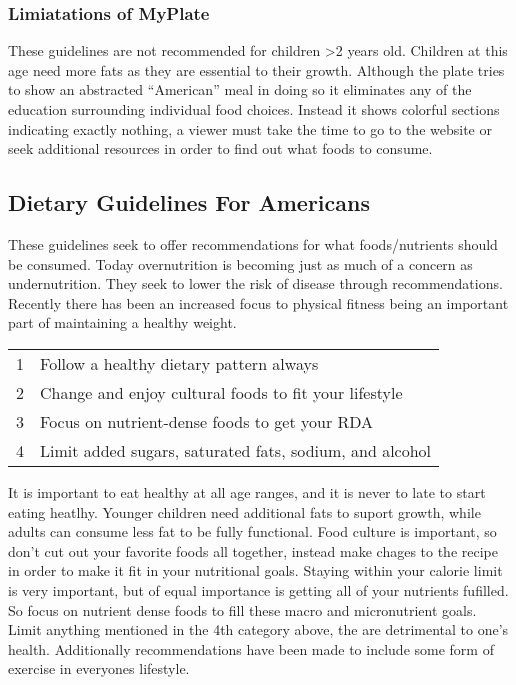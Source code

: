 \documentclass[letterpaper, 11pt]{article}
\begin{document}
\subsubsection{Limiatations of MyPlate}
\label{sec:org5655828}
These guidelines are not recommended for children >2 years old. Children at this age need more fats as they are essential to their growth. Although the plate tries to show an abstracted ``American'' meal in doing so it eliminates any of the education surrounding individual food choices. Instead it shows colorful sections indicating exactly nothing, a viewer must take the time to go to the website or seek additional resources in order to find out what foods to consume.\\
\subsection{Dietary Guidelines For Americans}
\label{sec:org3f27608}
These guidelines seek to offer recommendations for what foods/nutrients should be consumed. Today overnutrition is becoming just as much of a concern as undernutrition. They seek to lower the risk of disease through recommendations. Recently there has been an increased focus to physical fitness being an important part of maintaining a healthy weight.\\
\begin{center}
\begin{tabular}{rl}
1 & Follow a healthy dietary pattern always\\
2 & Change and enjoy cultural foods to fit your lifestyle\\
3 & Focus on nutrient-dense foods to get your RDA\\
4 & Limit added sugars, saturated fats, sodium, and alcohol\\
\end{tabular}
\end{center}
It is important to eat healthy at all age ranges, and it is never to late to start eating heatlhy. Younger children need additional fats to suport growth, while adults can consume less fat to be fully functional. Food culture is important, so don't cut out your favorite foods all together, instead make chages to the recipe in order to make it fit in your nutritional goals. Staying within your calorie limit is very important, but of equal importance is getting all of your nutrients fufilled. So focus on nutrient dense foods to fill these macro and micronutrient goals. Limit anything mentioned in the 4th category above, the are detrimental to one's health. Additionally recommendations have been made to include some form of exercise in everyones lifestyle.\\
\end{document}
